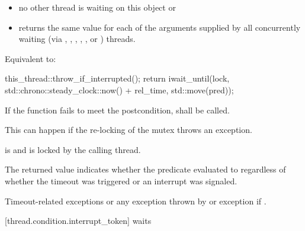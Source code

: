 {\begin{itemdescr}
        \begin{itemize}
        \item no other thread is waiting on this  object or
        \item {} returns the same value for each of the 
                arguments supplied by all concurrently waiting (via ,
                , ,
                {\color{insertcolor} , , or }) threads.
        \end{itemize}

{\color{diffcolor}
 \pnum \effects Equivalent to:
\begin{codeblock}
this_thread::throw_if_interrupted();
return iwait_until(lock,
                   std::chrono::steady_clock::now() + rel_time,
                   std::move(pred));
\end{codeblock}
}%

 \pnum \remarks
        If the function fails to meet the postcondition, 
        shall be called.
        \begin{note} This can happen if the re-locking of the mutex throws an exception. \end{note}

 \pnum \postconditions {} is  and 
        is locked by the calling thread.

 \pnum \begin{note} The returned value indicates whether the predicate evaluated to
         regardless of whether the timeout was triggered
        {\color{diffcolor} or an interrupt was signaled}. \end{note}

 \pnum \throws Timeout-related exceptions or any exception thrown by 
                {\color{diffcolor}or exception  if
                 }.

\end{itemdescr}

[thread.condition.interrupt_token]{ waits}

}

